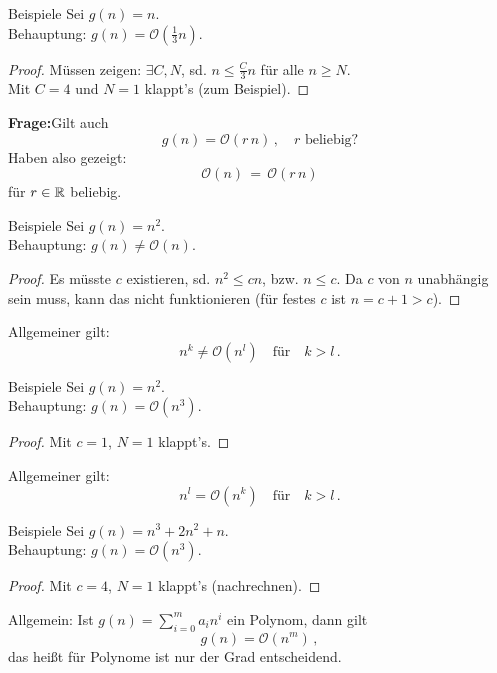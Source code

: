 \documentclass[aspectratio=169,handout]{beamer}
\begin{document}
\begin{frame}{Beispiele}
  Sei $g(n) = n$.\\ Behauptung: $g(n) = \mathcal{O}(\frac{1}{3}n)$.\\[2ex]
  \pause
  \begin{proof}
    Müssen zeigen: $\exists C, N$, sd. $n \le \frac{C}{3}n$ für alle $n \ge N$.\\[2ex]
    \pause
    Mit $C = 4$ und $N = 1$ klappt's (zum Beispiel).
  \end{proof}
  \pause
  \textbf{Frage:}\quad Gilt auch
  \[
     g(n) = \mathcal{O}(r\,n)\,,\quad r \text{ beliebig?}
   \]
   \pause
   Haben also gezeigt:
   \[
     \mathcal{O}(n) \, = \, \mathcal{O}(r\,n)
   \]
   für $r \in \mathbb{R}$ beliebig.
 \end{frame}

 \begin{frame}{Beispiele}
  Sei $g(n) = n^2$.\\ Behauptung: $g(n) \neq \mathcal{O}(n)$.\\[2ex]
  \pause
  \begin{proof}
    Es müsste $c$ existieren, sd. $n^2 \le cn$, bzw.
    $n \le c$.
    \pause
    Da $c$ von $n$ unabhängig sein muss, kann das nicht funktionieren
    (für festes $c$ ist $n = c+1 > c$).
  \end{proof}
  \pause
  Allgemeiner gilt:
  \[
    n^k \neq \mathcal{O}(n^l) \quad \text{für} \quad k > l \,.
  \]
\end{frame}

\begin{frame}{Beispiele}
  Sei $g(n) = n^2$.\\ Behauptung: $g(n) = \mathcal{O}(n^3)$.\\[2ex]
  \pause
  \begin{proof}
    Mit $c = 1$, $N = 1$ klappt's.
  \end{proof}
  \pause
  Allgemeiner gilt:
  \[
    n^l = \mathcal{O}(n^k) \quad \text{für} \quad k > l \,.
  \]
\end{frame}

\begin{frame}{Beispiele}
  Sei $g(n) = n^3 + 2n^2 + n$.\\ Behauptung: $g(n) = \mathcal{O}(n^3)$.\\[2ex]
  \pause
  \begin{proof}
    Mit $c = 4$, $N = 1$ klappt's (nachrechnen).
  \end{proof}
  \pause
  Allgemein: Ist $g(n) = \sum_{i=0}^m a_i n^i$ ein Polynom, dann gilt
  \[
    g(n) = \mathcal{O}(n^m)\,,
  \]
  das heißt für Polynome ist nur der Grad entscheidend.
\end{frame}
\end{document}
